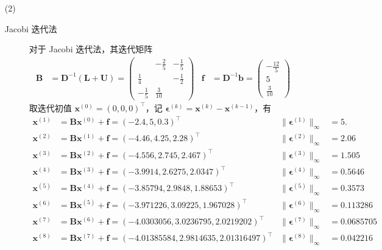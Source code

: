 \documentclass{sjtuarticle}
\begin{document}
\begin{itemize}
\begin{solution}
\begin{itemize}
        \item[(2)] 
        \begin{description}
            \item[Jacobi 迭代法] 
        对于 Jacobi 迭代法，其迭代矩阵
        \begin{align*}
            \bm{B}&=\bm{D}^{-1}(\bm{L}+\bm{U})=\begin{pmatrix}
                & -\frac{2}{5} & -\frac{1}{5} \\
                \frac{1}{4} & & -\frac{1}{2} \\
                -\frac{1}{5} & \frac{3}{10} & 
            \end{pmatrix} & \bm{f}&=\bm{D}^{-1}\bm{b}=\begin{pmatrix}
                -\frac{12}{5} \\ 5 \\ \frac{3}{10}
            \end{pmatrix}
        \end{align*}
        取迭代初值 $\bm{x}^{(0)}=(0,0,0)^\top$，记 $\bm{\epsilon}^{(k)}=\bm{x}^{(k)}-\bm{x}^{(k-1)}$，有
        \begin{align*}
            \bm{x}^{(1)}&=\bm{B}\bm{x}^{(0)}+\bm{f}=\left(-2.4, 5, 0.3\right)^\top & \lVert\bm{\epsilon}^{(1)}\rVert_{\infty}&=5. \\
            \bm{x}^{(2)}&=\bm{B}\bm{x}^{(1)}+\bm{f}=\left(-4.46, 4.25, 2.28\right)^\top & \lVert\bm{\epsilon}^{(2)}\rVert_{\infty}&=2.06 \\
            \bm{x}^{(3)}&=\bm{B}\bm{x}^{(2)}+\bm{f}=\left(-4.556, 2.745, 2.467\right)^\top & \lVert\bm{\epsilon}^{(3)}\rVert_{\infty}&=1.505 \\
            \bm{x}^{(4)}&=\bm{B}\bm{x}^{(3)}+\bm{f}=\left(-3.9914, 2.6275, 2.0347\right)^\top & \lVert\bm{\epsilon}^{(4)}\rVert_{\infty}&=0.5646 \\
            \bm{x}^{(5)}&=\bm{B}\bm{x}^{(4)}+\bm{f}=\left(-3.85794, 2.9848, 1.88653\right)^\top & \lVert\bm{\epsilon}^{(5)}\rVert_{\infty}&=0.3573 \\
            \bm{x}^{(6)}&=\bm{B}\bm{x}^{(5)}+\bm{f}=\left(-3.971226, 3.09225, 1.967028\right)^\top & \lVert\bm{\epsilon}^{(6)}\rVert_{\infty}&=0.113286 \\
            \bm{x}^{(7)}&=\bm{B}\bm{x}^{(6)}+\bm{f}=\left(-4.0303056, 3.0236795, 2.0219202\right)^\top & \lVert\bm{\epsilon}^{(7)}\rVert_{\infty}&=0.0685705 \\
            \bm{x}^{(8)}&=\bm{B}\bm{x}^{(7)}+\bm{f}=\left(-4.01385584, 2.9814635, 2.01316497\right)^\top & \lVert\bm{\epsilon}^{(8)}\rVert_{\infty}&=0.042216 \\

\end{align*}
\end{description}
\end{itemize}
\end{solution}
\end{itemize}
\end{document}
